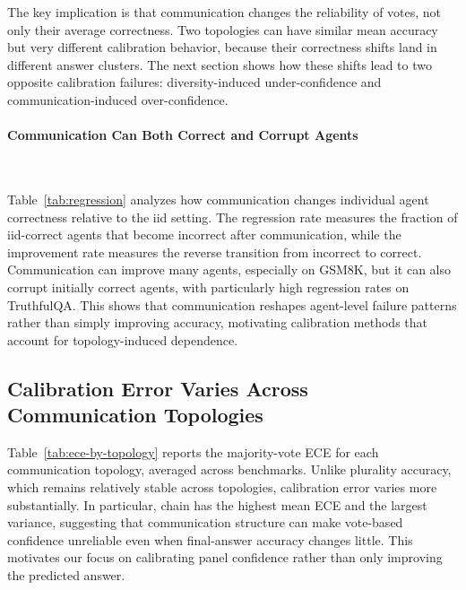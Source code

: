 The key implication is that communication changes the reliability of votes, not only their average correctness. 
Two topologies can have similar mean accuracy but very different calibration behavior, because their correctness shifts land in different answer clusters. 
The next section shows how these shifts lead to two opposite calibration failures: diversity-induced under-confidence and communication-induced over-confidence.

\paragraph{Communication Can Both Correct and Corrupt Agents}\
\label{con:com_correct_ir_correct}

Table~\ref{tab:regression} analyzes how communication changes individual agent correctness relative to the iid setting. 
The regression rate measures the fraction of iid-correct agents that become incorrect after communication, while the improvement rate measures the reverse transition from incorrect to correct. 
Communication can improve many agents, especially on GSM8K, but it can also corrupt initially correct agents, with particularly high regression rates on TruthfulQA. 
This shows that communication reshapes agent-level failure patterns rather than simply improving accuracy, motivating calibration methods that account for topology-induced dependence.

\subsection{Calibration Error Varies Across Communication Topologies}
\label{con:calibation_error_varios_topo}



Table~\ref{tab:ece-by-topology} reports the majority-vote ECE for each communication topology, averaged across benchmarks. Unlike plurality accuracy, which remains relatively stable across topologies, calibration error varies more substantially. In particular, chain has the highest mean ECE and the largest variance, suggesting that communication structure can make vote-based confidence unreliable even when final-answer accuracy changes little. This motivates our focus on calibrating panel confidence rather than only improving the predicted answer.



